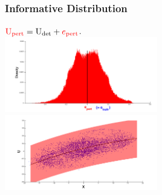 \documentclass[graphics]{beamer}
\begin{document}
\begin{frame}
   \frametitle{Informative Distribution}
   \vspace{20pt}
   $  {\color{red} \text{U}_{\text{pert}} } = {\color{black} \text{U}_{\text{det}}} + {\color{red} e_{\text{pert}} } $. \\
       \includegraphics[width=0.5\textwidth, height=.55\textwidth]{hist_r_exp1_pert_black} %
   \includegraphics[width=0.5\textwidth, height=.55\textwidth]{stoch_cloud_finalcurve_pert_swath} %
\end{frame}
\end{document}
